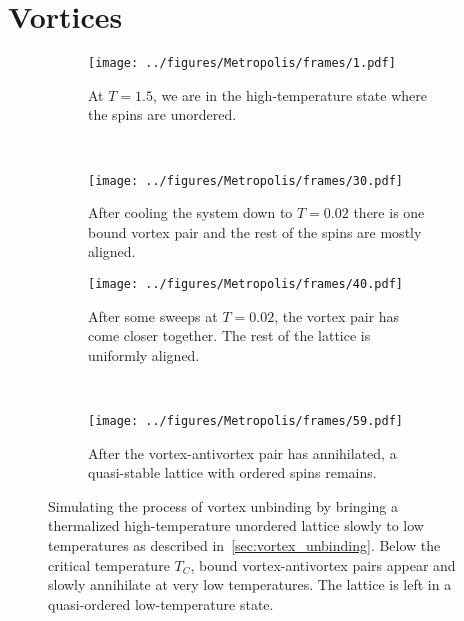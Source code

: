 \chapter{Vortices}\label{chap:vortices}
		\begin{figure}[H]
			\centering
			\begin{subfigure}[h]{0.45\textwidth}
				\centering
				\texttt{[image: ../figures/Metropolis/frames/1.pdf]}
				\caption{At $T=\num{1.5}$, we are in the high-temperature state where the spins are unordered.}
			\end{subfigure}
			~
			\begin{subfigure}[h]{0.45\textwidth}
				\centering
				\texttt{[image: ../figures/Metropolis/frames/30.pdf]}
				\caption{After cooling the system down to $T=\num{0.02}$ there is one bound vortex pair and the rest of the spins are mostly aligned.}
			\end{subfigure}
			\begin{subfigure}[h]{0.45\textwidth}
				\centering
				\texttt{[image: ../figures/Metropolis/frames/40.pdf]}
				\caption{After some sweeps at $T=\num{0.02}$, the vortex pair has come closer together. The rest of the lattice is uniformly aligned.}
			\end{subfigure}
			~
			\begin{subfigure}[h]{0.45\textwidth}
				\centering
				\texttt{[image: ../figures/Metropolis/frames/59.pdf]}
				\caption{After the vortex-antivortex pair has annihilated, a quasi-stable lattice with ordered spins remains.}
			\end{subfigure}
			\caption[Vortex unbinding of vortex-antivortex pairs at low temperatures]{Simulating the process of vortex unbinding by bringing a thermalized high-temperature unordered lattice slowly to low temperatures as described in~\cref{sec:vortex_unbinding}. Below the critical temperature $T_C$, bound vortex-antivortex pairs appear and slowly annihilate at very low temperatures. The lattice is left in a quasi-ordered low-temperature state.}
			\label{fig:vortex_unbinding}
		\end{figure}